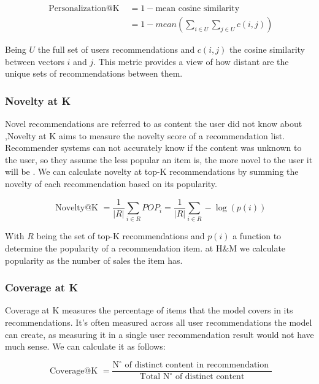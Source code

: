 \documentclass{tex_files/kththesis}
\begin{document}
\begin{equation}
\begin{aligned}
\text { Personalization@K } &= 1 - \text{mean cosine similarity} \\
&= 1 - mean(\sum_{i \in U}\sum_{j \in U}c(i,j))
\end{aligned}
\end{equation}

Being $U$ the full set of users recommendations and $c(i,j)$ the cosine similarity between vectors $i$ and $j$. This metric provides a view of how distant are the unique sets of recommendations between them.


\subsubsection{Novelty at K}
Novel recommendations are referred to as content the user did not know about \cite{noveltyintro},Novelty at K aims to measure the novelty score of a recommendation list. Recommender systems can not accurately know if the content was unknown to the user, so they assume the less popular an item is, the more novel to the user it will be \cite{noveltyassumption}. We can calculate novelty at top-K recommendations by summing the novelty of each recommendation based on its popularity. 


\begin{equation}
\text { Novelty@K }=\frac{1}{|R|} \sum_{i \in R} P O P_{i}=\frac{1}{|R|} \sum_{i \in R}-\log (p(i))
\end{equation}

With $R$ being the set of top-K recommendations and $p(i)$ a function to determine the popularity of a recommendation item. at H\&M we calculate popularity as the number of sales the item has.

\subsubsection{Coverage at K}
Coverage at K measures the percentage of items that the model covers in its recommendations. It's often measured across all user recommendations the model can create, as measuring it in a single user recommendation result would not have much sense. We can calculate it as follows:

\begin{equation}
\text { Coverage@K }=\frac{\mathrm{N}^{\circ} \text { of distinct content in recommendation }}{\text { Total } \mathrm{N}^{\circ} \text { of distinct content }}
\end{equation}
\end{document}
